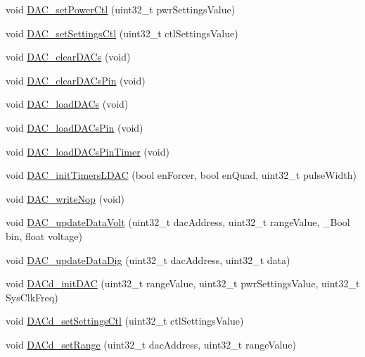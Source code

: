 \begin{DoxyCompactItemize}
\item 
void \hyperlink{group___d_a_c__ad5754_gae1622532a9332006dd5f19a22b98825b}{D\+A\+C\+\_\+set\+Power\+Ctl} (uint32\+\_\+t pwr\+Settings\+Value)
\item 
void \hyperlink{group___d_a_c__ad5754_ga4c9d4568cf8efdb66e2ded3e2bde168d}{D\+A\+C\+\_\+set\+Settings\+Ctl} (uint32\+\_\+t ctl\+Settings\+Value)
\item 
void \hyperlink{group___d_a_c__ad5754_ga2db4e1ba2471f68b497c3d6db1ab7726}{D\+A\+C\+\_\+clear\+D\+A\+Cs} (void)
\item 
void \hyperlink{group___d_a_c__ad5754_ga22ab2e74e2db83f7af5d9888f641d8c5}{D\+A\+C\+\_\+clear\+D\+A\+Cs\+Pin} (void)
\item 
void \hyperlink{group___d_a_c__ad5754_ga1f7eda4d64087b938f5f62ec8e8cbe5e}{D\+A\+C\+\_\+load\+D\+A\+Cs} (void)
\item 
void \hyperlink{group___d_a_c__ad5754_gaa375fe95555a421ca76283998e64ae41}{D\+A\+C\+\_\+load\+D\+A\+Cs\+Pin} (void)
\item 
void \hyperlink{group___d_a_c__ad5754_ga65c9a05f616fd3cc94415869edf0c9c0}{D\+A\+C\+\_\+load\+D\+A\+Cs\+Pin\+Timer} (void)
\item 
void \hyperlink{group___d_a_c__ad5754_ga4204dbf05cb09398e186dcd71d37e0d7}{D\+A\+C\+\_\+init\+Timers\+L\+D\+A\+C} (bool en\+Forcer, bool en\+Quad, uint32\+\_\+t pulse\+Width)
\item 
void \hyperlink{group___d_a_c__ad5754_ga5c92c520051e198a9d24f5d14893f506}{D\+A\+C\+\_\+write\+Nop} (void)
\item 
void \hyperlink{group___d_a_c__ad5754_gae6d7c8f3167d84f60a56a3c1bb6252b7}{D\+A\+C\+\_\+update\+Data\+Volt} (uint32\+\_\+t dac\+Address, uint32\+\_\+t range\+Value, \+\_\+\+Bool bin, float voltage)
\item 
void \hyperlink{group___d_a_c__ad5754_ga6042bbafba1e30640f0dbdd9dbe4d6b1}{D\+A\+C\+\_\+update\+Data\+Dig} (uint32\+\_\+t dac\+Address, uint32\+\_\+t data)
\item 
void \hyperlink{group___d_a_c__ad5754_ga4d051b751ee930dca68513b6c7dec46e}{D\+A\+Cd\+\_\+init\+D\+A\+C} (uint32\+\_\+t range\+Value, uint32\+\_\+t pwr\+Settings\+Value, uint32\+\_\+t Sys\+Clk\+Freq)
\item 
void \hyperlink{group___d_a_c__ad5754_gac3aeb454aade9dd1def535c072ea78fd}{D\+A\+Cd\+\_\+set\+Settings\+Ctl} (uint32\+\_\+t ctl\+Settings\+Value)
\item 
void \hyperlink{group___d_a_c__ad5754_ga20458db50830182bcf912a60e9df04cd}{D\+A\+Cd\+\_\+set\+Range} (uint32\+\_\+t dac\+Address, uint32\+\_\+t range\+Value)

\end{DoxyCompactItemize}
